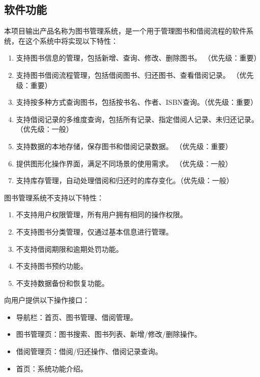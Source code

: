 \documentclass[UTF-8]{ctexart}
\begin{document}
\subsection{软件功能}
本项目输出产品名称为图书管理系统，是一个用于管理图书和借阅流程的软件系统，在这个系统中将实现以下特性：
\begin{enumerate}[label=\arabic{enumi}、]
\item 支持图书信息的管理，包括新增、查询、修改、删除图书。 （优先级：重要）
\item 支持图书借阅流程管理，包括借阅图书、归还图书、查看借阅记录。 （优先级：重要）
\item 支持按多种方式查询图书，包括按书名、作者、ISBN查询。（优先级：重要）
\item 支持借阅记录的多维度查询，包括所有记录、指定借阅人记录、未归还记录。 （优先级：一般）
\item 支持数据的本地存储，保存图书和借阅记录数据。 （优先级：重要）
\item 提供图形化操作界面，满足不同场景的使用需求。 （优先级：一般）
\item 支持库存管理，自动处理借阅和归还时的库存变化。（优先级：一般）
\end{enumerate}

图书管理系统不支持以下特性： 
\begin{enumerate}[label=\arabic{enumi}、]
\item 不支持用户权限管理，所有用户拥有相同的操作权限。 
\item 不支持图书分类管理，仅通过基本信息进行管理。 
\item 不支持借阅期限和逾期处罚功能。 
\item 不支持图书预约功能。 
\item 不支持数据备份和恢复功能。
\end{enumerate}

向用户提供以下操作接口：
\begin{itemize}
\item 导航栏：首页、图书管理、借阅管理。
\item 图书管理页：图书搜索、图书列表、新增/修改/删除操作。
\item 借阅管理页：借阅/归还操作、借阅记录查询。
\item 首页：系统功能介绍。
\end{itemize}
\end{document}
